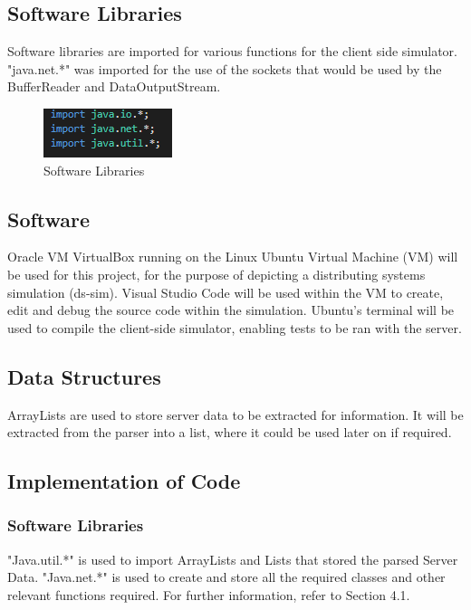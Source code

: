 \documentclass[a4paper]{article} %
\begin{document}
\subsection{Software Libraries}
Software libraries are imported for various functions for the client side simulator. "java.net.*" was imported for the use of the sockets that would be used by the BufferReader and DataOutputStream.

\begin{figure}[H]
\begin{center}
\includegraphics[scale=0.6]{Software Libraries.png}
\caption{Software Libraries}
\end{center}
\end{figure}

\subsection{Software}
Oracle VM VirtualBox running on the Linux Ubuntu Virtual Machine (VM) will be used for this project, for the purpose of depicting a distributing systems simulation (ds-sim). Visual Studio Code\cite{vsc} will be used within the VM to create, edit and debug the source code within the simulation. Ubuntu's terminal will be used to compile the client-side simulator, enabling tests to be ran with the server.

\subsection{Data Structures}
ArrayLists are used to store server data to be extracted for information. It will be extracted from the parser into a list, where it could be used later on if required.

\subsection{Implementation of Code}
\subsubsection{Software Libraries}
"Java.util.*" is used to import ArrayLists and Lists that stored the parsed Server Data. "Java.net.*" is used to create and store all the required classes and other relevant functions required. For further information, refer to Section 4.1.
\end{document}
